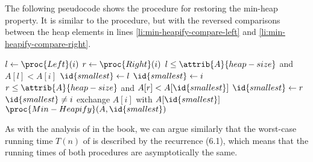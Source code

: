 The following pseudocode shows the procedure for restoring the min-heap property.
It is similar to the  procedure, but with the reversed comparisons between the heap elements in lines \ref{li:min-heapify-compare-left} and \ref{li:min-heapify-compare-right}.

\begin{codebox}
\li $l\gets\proc{Left}(i)$
\li $r\gets\proc{Right}(i)$
\li \If $l\le\attrib{A}{heap-size}$ and $A[l]<A[i]$ \label{li:min-heapify-compare-left}
\li     \Then $\id{smallest}\gets l$
\li     \Else $\id{smallest}\gets i$
        \End
\li \If $r\le\attrib{A}{heap-size}$ and $A[r]<A[\id{smallest}]$ \label{li:min-heapify-compare-right}
\li     \Then $\id{smallest}\gets r$
        \End
\li \If $\id{smallest}\ne i$
\li     \Then exchange $A[i]$ with $A[\id{smallest}]$
\li         $\proc{Min-Heapify}(A,\id{smallest})$
        \End
\end{codebox}

As with the analysis of  in the book, we can argue similarly that the worst-case running time $T(n)$ of  is described by the recurrence (6.1), which means that the running times of both procedures are asymptotically the same.

